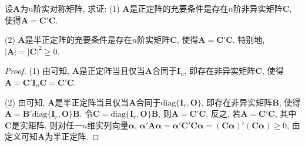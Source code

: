 \documentclass[../../main.tex]{subfiles}
\begin{document}
\begin{proposition}[正定和半正定阵的判定准则]\label{proposition:正定和半正定阵的判定准则}
设$\boldsymbol{A}$为$n$阶实对称矩阵, 求证:
(1) $\boldsymbol{A}$是正定阵的充要条件是存在$n$阶非异实矩阵$\boldsymbol{C}$, 使得$\boldsymbol{A}=\boldsymbol{C}'\boldsymbol{C}$.

(2) $\boldsymbol{A}$是半正定阵的充要条件是存在$n$阶实矩阵$\boldsymbol{C}$, 使得$\boldsymbol{A}=\boldsymbol{C}'\boldsymbol{C}$. 特别地, $|\boldsymbol{A}| = |\boldsymbol{C}|^2\geq 0$.
\end{proposition}
\begin{proof}
(1) 由可知, $\boldsymbol{A}$是正定阵当且仅当$\boldsymbol{A}$合同于$\boldsymbol{I}_n$, 即存在非异实矩阵$\boldsymbol{C}$, 使得$\boldsymbol{A}=\boldsymbol{C}'\boldsymbol{I}_n\boldsymbol{C}=\boldsymbol{C}'\boldsymbol{C}$.

(2) 由可知, $\boldsymbol{A}$是半正定阵当且仅当$\boldsymbol{A}$合同于$\text{diag}\{\boldsymbol{I}_r, \boldsymbol{O}\}$, 即存在非异实矩阵$\boldsymbol{B}$, 使得$\boldsymbol{A}=\boldsymbol{B}'\text{diag}\{\boldsymbol{I}_r, \boldsymbol{O}\}\boldsymbol{B}$. 令$\boldsymbol{C}=\text{diag}\{\boldsymbol{I}_r, \boldsymbol{O}\}\boldsymbol{B}$, 则$\boldsymbol{A}=\boldsymbol{C}'\boldsymbol{C}$. 反之, 若$\boldsymbol{A}=\boldsymbol{C}'\boldsymbol{C}$, 其中$\boldsymbol{C}$是实矩阵, 则对任一$n$维实列向量$\boldsymbol{\alpha}$, $\boldsymbol{\alpha}'\boldsymbol{A}\boldsymbol{\alpha}=\boldsymbol{\alpha}'\boldsymbol{C}'\boldsymbol{C}\boldsymbol{\alpha}=(\boldsymbol{C}\boldsymbol{\alpha})'(\boldsymbol{C}\boldsymbol{\alpha})\geq 0$, 由定义可知$\boldsymbol{A}$为半正定阵.
\end{proof}
\end{document}
